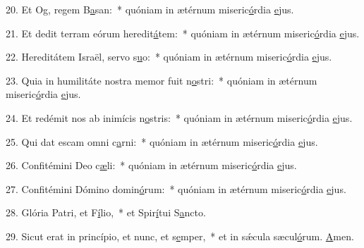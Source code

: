 20. Et Og, regem B\uline{a}san:~* quóniam in ætérnum miseric\uline{ó}rdia \uline{e}jus.\par 
21. Et dedit terram eórum heredit\uline{á}tem:~* quóniam in ætérnum miseric\uline{ó}rdia \uline{e}jus.\par 
22. Hereditátem Israël, servo s\uline{u}o:~* quóniam in ætérnum miseric\uline{ó}rdia \uline{e}jus.\par 
23. Quia in humilitáte nostra memor fuit n\uline{o}stri:~* quóniam in ætérnum miseric\uline{ó}rdia \uline{e}jus.\par 
24. Et redémit nos ab inimícis n\uline{o}stris:~* quóniam in ætérnum miseric\uline{ó}rdia \uline{e}jus.\par 
25. Qui dat escam omni c\uline{a}rni:~* quóniam in ætérnum miseric\uline{ó}rdia \uline{e}jus.\par 
26. Confitémini Deo c\uline{æ}li:~* quóniam in ætérnum miseric\uline{ó}rdia \uline{e}jus.\par 
27. Confitémini Dómino domin\uline{ó}rum:~* quóniam in ætérnum miseric\uline{ó}rdia \uline{e}jus.\par 
28. Glória Patri, et F\uline{í}lio,~* et Spir\uline{í}tui S\uline{a}ncto.\par 
29. Sicut erat in princípio, et nunc, et s\uline{e}mper,~* et in sǽcula sæcul\uline{ó}rum. \uline{A}men.\par 

